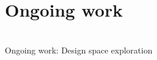 \newcommand\design[1]{{\color{design}#1}}
\newcommand\spec[1]{{\color{spec}#1}}
\newcommand\margin[1]{{\color{margin}#1}}
\newcommand\perf[1]{{\color{perf}#1}}
\section{Ongoing work}
\begin{frame}[c,noframenumbering]
	\centering
	\begin{titleblock}{}
		~\\%
		{\centering\LARGE Ongoing work: Design space exploration\\}%
		~\\%
	\end{titleblock}
\end{frame}
